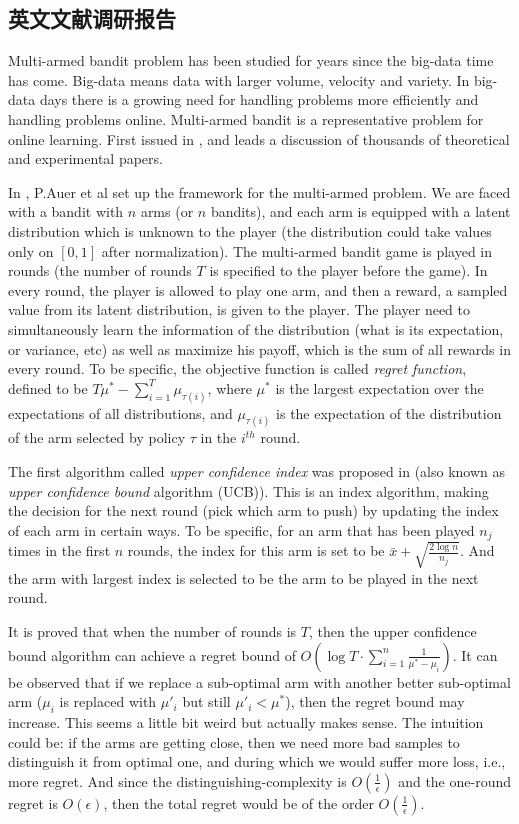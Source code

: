 \documentclass[bachelor]{thuthesis}
\begin{document}
\begin{appendix}


\chapter{英文文献调研报告}
\label{cha:engorg}


Multi-armed bandit problem has been studied for years since the big-data time has come. Big-data means data with larger volume, velocity and variety. In big-data days there is a growing need for handling problems more efficiently and handling problems online. Multi-armed bandit is a representative problem for online learning. First issued in \cite{finite}, and leads a discussion of thousands of theoretical and experimental papers.

In \cite{finite}, P.Auer et al set up the framework for the multi-armed problem. We are faced with a bandit with $n$ arms (or $n$ bandits), and each arm is equipped with a latent distribution which is unknown to the player (the distribution could take values only on $[0,1]$ after normalization). The multi-armed bandit game is played in rounds (the number of rounds $T$ is specified to the player before the game). In every round, the player is allowed to play one arm, and then a reward, a sampled value from its latent distribution, is given to the player. The player need to simultaneously learn the information of the distribution (what is its expectation, or variance, etc) as well as maximize his payoff, which is the sum of all rewards in every round. To be specific, the objective function is called \emph{regret function}, defined to be $T\mu^{*}-\sum_{i=1}^{T}\mu_{\tau(i)}$, where $\mu^*$ is the largest expectation over the expectations of all distributions, and $\mu_{\tau(i)}$ is the expectation of the distribution of the arm selected by policy $\tau$ in the $i^{th}$ round.

The first algorithm called \emph{upper confidence index} was proposed in \cite{finite} (also known as \emph{upper confidence bound} algorithm (UCB)). This is an index algorithm, making the decision for the next round (pick which arm to push) by updating the index of each arm in certain ways. To be specific, for an arm that has been played $n_j$ times in the first $n$ rounds, the index for this arm is set to be $\bar{x}+\sqrt{\frac{2\log n}{n_j}}$. And the arm with largest index is selected to be the arm to be played in the next round.

It is proved that when the number of rounds is $T$, then the upper confidence bound algorithm can achieve a regret bound of $O(\log T\cdot\sum_{i=1}^{n}\frac{1}{\mu^*-\mu_i})$. It can be observed that if we replace a sub-optimal arm with another better sub-optimal arm ($\mu_i$ is replaced with $\mu'_i$ but still $\mu'_i<\mu^*$), then the regret bound may increase. This seems a little bit weird but actually makes sense. The intuition could be: if the arms are getting close, then we need more bad samples to distinguish it from optimal one, and during which we would suffer more loss, i.e., more regret. And since the distinguishing-complexity is $O(\frac{1}{\epsilon})$ and the one-round regret is $O(\epsilon)$, then the total regret would be of the order $O(\frac{1}{\epsilon})$.


\end{appendix}
\end{document}
